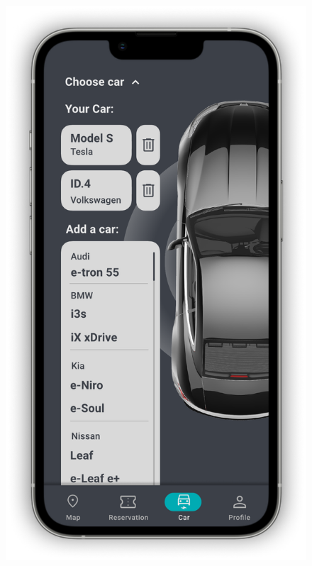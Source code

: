 \begin{figure}[H]
{        \includegraphics[scale=0.32,page=1]{src/mockups/car_add.pdf}
    }
    \newline
    \subfloat[Reservations]{
}
\end{figure}
